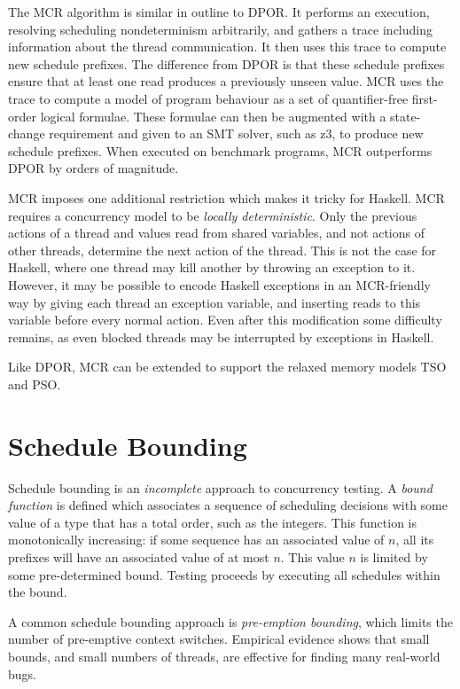 The MCR algorithm is similar in outline to DPOR\@.  It performs an
execution, resolving scheduling nondeterminism arbitrarily, and
gathers a trace including information about the thread communication.
It then uses this trace to compute new schedule prefixes.  The
difference from DPOR is that these schedule prefixes ensure that at
least one read produces a previously unseen value.  MCR uses the trace
to compute a model of program behaviour as a set of quantifier-free
first-order logical formulae.  These formulae can then be augmented
with a state-change requirement and given to an SMT
solver\cite{demoura2011}, such as z3\cite{demoura2008}, to produce new
schedule prefixes.  When executed on benchmark programs, MCR
outperforms DPOR by orders of magnitude\cite{huang2017}.

MCR imposes one additional restriction which makes it tricky for
Haskell.  MCR requires a concurrency model to be \emph{locally
  deterministic}\cite{huang2015}.  Only the previous actions of a
thread and values read from shared variables, and not actions of other
threads, determine the next action of the thread.  This is not the
case for Haskell, where one thread may kill another by throwing an
exception to it.  However, it may be possible to encode Haskell
exceptions in an MCR-friendly way by giving each thread an exception
variable, and inserting reads to this variable before every normal
action.  Even after this modification some difficulty remains, as even
blocked threads may be interrupted by exceptions in Haskell.

Like DPOR, MCR can be extended to support the relaxed memory models TSO and
PSO\cite{huang2016}.

\section{Schedule Bounding}
\label{sec:sct-bounding}

Schedule bounding\cite{emmi2011,musuvathi2008,musuvathi2007} is an
\emph{incomplete} approach to concurrency testing.  A \emph{bound function} is
defined which associates a sequence of scheduling decisions with some value of a
type that has a total order, such as the integers.  This function is
monotonically increasing: if some sequence has an associated value of $n$, all
its prefixes will have an associated value of at most $n$.  This value $n$ is
limited by some pre-determined bound.  Testing proceeds by executing all
schedules within the bound.

A common schedule bounding approach is \emph{pre-emption
  bounding}\cite{musuvathi2007}, which limits the number of
pre-emptive context switches.  Empirical evidence shows that small
bounds, and small numbers of threads, are effective for finding many
real-world bugs\cite{thomson2014}.

